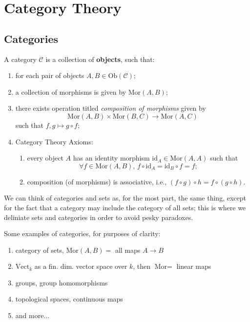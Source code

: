 \documentclass{article}
\begin{document}

\section{Category Theory}


\subsection{Categories}

\begin{definition}[Category]
  A category \( \mathscr{C} \) is a collection of \textbf{objects}, such that:

  \begin{enumerate}[(i.)]
    \item for each pair of objects \( A,B\in  \text{Ob}(\mathscr{C} )   \);
    \item a collection of morphisms is given by \( \text{Mor}(A,B) \);
    \item there exists operation titled \textit{composition of morphisms} given by \[ \text{Mor}(A,B)\times \text{Mor}(B,C) \to \text{Mor}(A,C) \] such that \( f,g \mapsto g \circ f \);
    \item Category Theory Axioms: \begin{enumerate}
        \item every object \( A \) has an identity morphism \( \text{id}_A \in  \text{Mor}(A,A) \) such that \[ \forall f \in  \text{Mor}(A,B), \, f \circ \text{id}_A=\text{id}_B\circ f=f ;\]
        \item composition (of morphisms) is associative, i.e., \( (f\circ g)\circ h= f\circ (g\circ h) \).
    \end{enumerate}
\end{enumerate}

\end{definition}

We can think of categories and sets as, for the most part, the same thing, except for the fact that a category may include the category of all sets; this is where we deliniate sets and categories in order to avoid pesky paradoxes. 

Some examples of categories, for purposes of clarity:
\begin{enumerate}
  \item category of sets, \( \text{Mor}(A,B)= \) all maps \( A \to  B \)
  \item \( \text{Vect}_k \) as a fin. dim. vector space over \( k \), then \( \text{Mor}= \) linear maps
  \item groups, group homomorphisms 
  \item topological spaces, continuous maps
  \item and more...
\end{enumerate}
\end{document}
